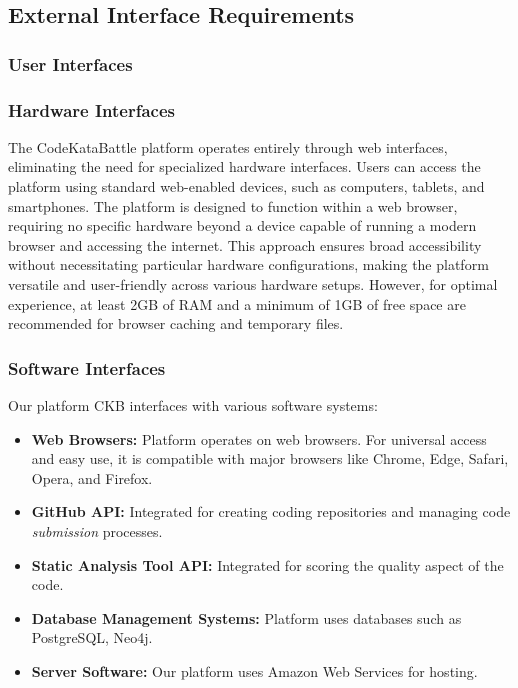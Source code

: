 \subsection{External Interface Requirements}

\subsubsection{User Interfaces}

\subsubsection{Hardware Interfaces}
The CodeKataBattle platform operates entirely through web interfaces, eliminating the need for specialized hardware interfaces. Users can access the platform using standard web-enabled devices, such as computers, tablets, and smartphones. The platform is designed to function within a web browser, requiring no specific hardware beyond a device capable of running a modern browser and accessing the internet. This approach ensures broad accessibility without necessitating particular hardware configurations, making the platform versatile and user-friendly across various hardware setups. However, for optimal experience, at least 2GB of RAM and a minimum of 1GB of free space are recommended for browser caching and temporary files.

\subsubsection{Software Interfaces}
Our platform CKB interfaces with various software systems:

\begin{itemize}
    \item \textbf{Web Browsers:} Platform operates on web browsers. For universal access and easy use, it is compatible with major browsers like Chrome, Edge, Safari, Opera, and Firefox.

    \item \textbf{GitHub API:} Integrated for creating coding repositories and managing code \textit{submission} processes.

    \item \textbf{Static Analysis Tool API:} Integrated for scoring the quality aspect of the code. 

    \item \textbf{Database Management Systems:} Platform uses databases such as PostgreSQL, Neo4j.

    \item \textbf{Server Software:} Our platform uses Amazon Web Services for hosting.
\end{itemize}

